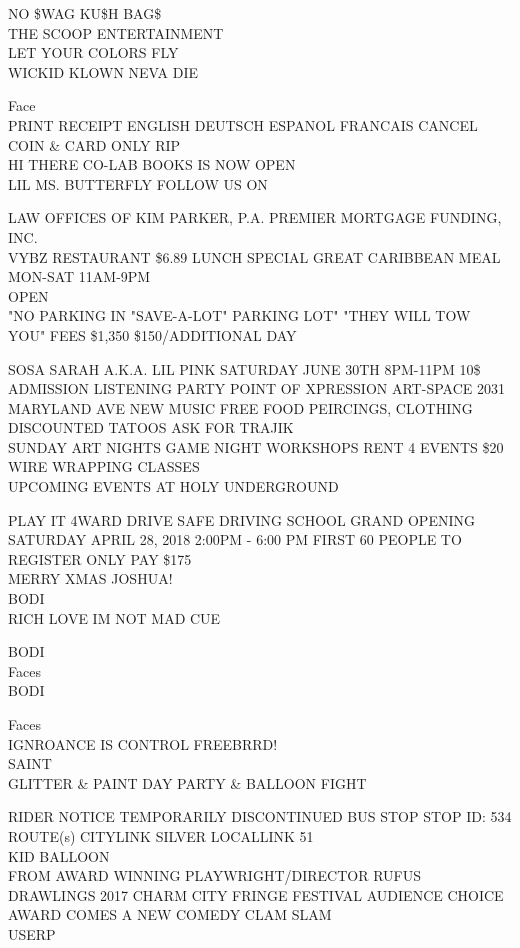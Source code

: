 \documentclass[10pt,letterpaper]{article}
\begin{document}
NO \$WAG KU\$H BAG\$\\
THE SCOOP ENTERTAINMENT\\
LET YOUR COLORS FLY\\
WICKID KLOWN NEVA DIE

Face\\
PRINT RECEIPT ENGLISH DEUTSCH ESPANOL FRANCAIS CANCEL COIN \& CARD ONLY RIP\\
HI THERE CO{-}LAB BOOKS IS NOW OPEN\\
LIL MS. BUTTERFLY FOLLOW US ON

LAW OFFICES OF KIM PARKER, P.A. PREMIER MORTGAGE FUNDING, INC.\\
VYBZ RESTAURANT \$6.89 LUNCH SPECIAL GREAT CARIBBEAN MEAL MON{-}SAT 11AM{-}9PM\\
OPEN\\
"NO PARKING IN "SAVE{-}A{-}LOT" PARKING LOT"  "THEY WILL TOW YOU"  FEES \$1,350 \$150/ADDITIONAL DAY

SOSA SARAH A.K.A. LIL PINK SATURDAY JUNE 30TH 8PM{-}11PM 10\$ ADMISSION LISTENING PARTY POINT OF XPRESSION ART{-}SPACE 2031 MARYLAND AVE NEW MUSIC FREE FOOD PEIRCINGS, CLOTHING DISCOUNTED TATOOS ASK FOR TRAJIK\\
SUNDAY ART NIGHTS GAME NIGHT WORKSHOPS RENT 4 EVENTS \$20 WIRE WRAPPING CLASSES\\
UPCOMING EVENTS AT HOLY UNDERGROUND

PLAY IT 4WARD DRIVE SAFE DRIVING SCHOOL GRAND OPENING SATURDAY APRIL 28, 2018 2:00PM {-} 6:00 PM FIRST 60 PEOPLE TO REGISTER ONLY PAY \$175\\
MERRY XMAS JOSHUA!\\
BODI\\
RICH LOVE IM NOT MAD CUE

BODI\\
Faces\\
BODI

Faces\\
IGNROANCE IS CONTROL FREEBRRD!\\
SAINT\\
GLITTER \& PAINT DAY PARTY \& BALLOON FIGHT

RIDER NOTICE TEMPORARILY DISCONTINUED BUS STOP STOP ID: 534 ROUTE(s) CITYLINK SILVER LOCALLINK 51\\
KID BALLOON\\
FROM AWARD WINNING PLAYWRIGHT/DIRECTOR RUFUS DRAWLINGS 2017 CHARM CITY FRINGE FESTIVAL AUDIENCE CHOICE AWARD COMES A NEW COMEDY CLAM SLAM\\
USERP
\end{document}
